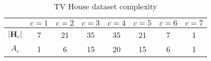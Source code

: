 \begin{table}[]
\centering
\begin{tabular}{c|c|c|c|c|c|c|c|}
\cline{2-8}
                       & $c = 1$ & $c = 2$ & $c = 3$ & $c = 4$ & $c = 5$ & $c = 6$ & $c = 7$ \\ \hline
\multicolumn{1}{|c|}{$|\textbf{H}_c|$} &    7   &    21   &    35   &    35   &   21    &   7    &    1  \\ \hline
\multicolumn{1}{|c|}{$A_c$} &    1   &     6  &     15  &     20  &    15   &    6   &    1   \\ \hline
\end{tabular}
\caption{TV House dataset complexity}
\label{Tab:TvHouse}
\end{table}